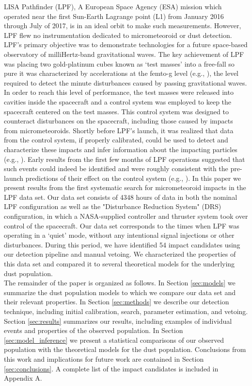 \documentclass[twocolumn, trackchanges]{aastex61}
\newcommand{\nhits}{54 } %
\newcommand{\nhours}{4348 }
\begin{document}
LISA Pathfinder (LPF), A European Space Agency (ESA) mission which operated near the first Sun-Earth Lagrange point (L1) from January 2016 through July of 2017, is in an ideal orbit to make such measurements. However, LPF flew no instrumentation dedicated to micrometeoroid or dust detection.  LPF's primary objective was to demonstrate technologies for a future space-based observatory of milliHertz-band gravitational waves. The key achievement of LPF was placing two gold-platinum cubes known as `test masses' into a free-fall so pure it was characterized by accelerations at the femto-g level (e.g., \cite{LPF_PRL_2016, LPF_PRL_2018}), the level required to detect the minute disturbances caused by passing gravitational waves. In order to reach this level of performance, the test masses were released into cavities inside the spacecraft and a control system was employed to keep the spacecraft centered on the test masses.  This control system was designed to counteract disturbances on the spacecraft, including those caused by impacts from micrometeoroids. Shortly before LPF's launch, it was realized that data from the control system, if properly calibrated, could be used to detect and characterize these impacts and infer information about the impacting particles (e.g., \cite{Thorpe:2015cxa}). Early results from the first few months of LPF operations suggested that such events could indeed be identified and were roughly consistent with the pre-launch predictions of their effect on the control system (e.g., \cite{Thorpe2017a}). In this paper we present results from the first systematic search for micrometeoroid impacts in the LPF data set.  Our data set consists of \nhours hours of data in both the nominal LPF configuration as well as the "Disturbance Reduction System" (DRS) configuration, in which a NASA-supplied controller and thruster system took over control of the spacecraft. Our data set corresponds to the times when LPF was operating in a `quiet' mode, without any intentional signal injections or other disturbances. During this period, we have identified \nhits impact candidates using our detection pipeline and manual vetoing. We characterized the properties of this data set and compared it to several theoretical models for the underlying dust population. 
\\
The remainder of the paper is organized as follows. In Section \ref{sec:models} we summarize the dust population models to which we compare our data set and their relevant properties. In Section \ref{sec:methods} we describe our detection technique, including initial calibration, search, parameter estimation, and vetoing. Section \ref{sec:results} summarizes our results, including examples of individual events and properties of the observed population. In Section \ref{sec:model_inference} we present a statistical comparisons of our observed population with the theoretical models for the dust population. Conclusions from this work and implications for future work are contained in Section \ref{sec:conclusions}. A complete list of the impact candidates is included in Appendix A. 
\end{document}
